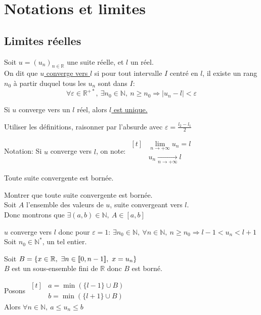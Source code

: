\documentclass[12pt,twoside,a4paper]{article}
\begin{document}
	\section{Notations et limites}
		\subsection{Limites r\'eelles}
			\begin{defi}
				Soit $u=(u_n)_{n\in\mathbb{R}}$ une suite r\'eelle, et $l$ un r\'eel.\\
				On dit que \underline{$u$ converge vers $l$} si pour tout intervalle $I$ centr\'e en $l$, il existe un rang $n_0$ \`a partir duquel tous les $u_n$ sont dans $I$:
				$$\forall\varepsilon\in\mathbb{R}^{+*},\ \exists n_0\in\mathbb{N},\ n\geqslant n_0\Rightarrow|u_n-l|<\varepsilon$$
			\end{defi}
			\begin{prop}
				Si $u$ converge vers un $l$ r\'eel, alors \underline{$l$ est unique.}
			\end{prop}
			\begin{preuve}
				Utiliser les d\'efinitions, raisonner par l'absurde avec $\varepsilon=\frac{l_2-l_1}{2}$
			\end{preuve}
			\begin{flushleft}
				Notation: Si $u$ converge vers $l$, on note: $\begin{aligned}[t]&\lim\limits_{n\rightarrow+\infty}u_n=l\\& u_n\mathop{\longrightarrow}\limits_{n\rightarrow+\infty}l \end{aligned}$
			\end{flushleft}
			\begin{prop}
				Toute suite convergente est born\'ee.
			\end{prop}
			\begin{preuve}
				Montrer que toute suite convergente est born\'ee.\\
				Soit $A$ l'ensemble des valeurs de $u$, suite convergeant vers $l$.\\
				Donc montrons que $\exists(a,b)\in\mathbb{N},\ A\in[a,b]$
				\begin{liste}
					\item $u$ converge vers $l$ donc pour $\varepsilon=1$: $\exists n_0\in\mathbb{N},\ \forall n\in\mathbb{N},\ n\geqslant n_0\Rightarrow l-1<u_n<l+1$\\
						Soit $n_0\in\mathbb{N}^*$, un tel entier.
					\item Soit $B=\{x\in\mathbb{R},\ \exists n\in[\![ 0,n-1]\!],\ x=u_n \}$\\
						$B$ est un sous-ensemble fini de $\mathbb{R}$ donc $B$ est born\'e.
				\end{liste}
				Posons $\begin{aligned}[t]&a=\min(\{l-1\}\cup B)\\&b=\min(\{l+1\}\cup B)\end{aligned}$\\
				Alors $\forall n\in\mathbb{N},\ a\leqslant u_n\leqslant b$
			\end{preuve}
\end{document}
